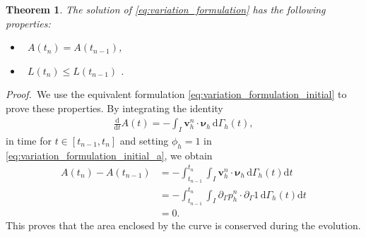\documentclass[review]{elsarticle}
\newtheorem{theorem}{Theorem}
\def\d{{\mathrm d}}
\begin{document}
\begin{theorem}\label{MainTHM1}
The solution of \eqref{eq:variation_formulation} has the following properties:
\begin{itemize}
\item[{\rm(1)}]~$A(t_n)= A(t_{n-1})$,
\item[{\rm(2)}]~$L(t_n)\le L(t_{n-1})$ .
\end{itemize}
\end{theorem}

{\it Proof.}$\,$
We use the equivalent formulation \eqref{eq:variation_formulation_initial} to prove these properties.
By integrating the identity
\begin{align*}
\frac{\d }{\d t} A(t)
=-\int_I  \mathbf{v}_h^n \cdot \boldsymbol{\nu}_h \, \d\Gamma_h(t) ,
\end{align*}
in time for $t\in[t_{n-1},t_n]$ and setting $\phi_h=1$ in \eqref{eq:variation_formulation_initial_a}, we obtain
\begin{align*}
A(t_{n}) - A(t_{n-1})
&=-\int_{t_{n-1}}^{t_n} \int_{I} \mathbf{v}_h^n \cdot \boldsymbol{\nu}_h \, \d\Gamma_h(t)\d t \\
&=-\int_{t_{n-1}}^{t_n} \int_{I} \partial_\Gamma p_h^n \cdot \partial_\Gamma 1 \, \d\Gamma_h(t) \d t \\
&=0.
\end{align*}
This proves that the area enclosed by the curve is conserved during the evolution.
\end{document}
